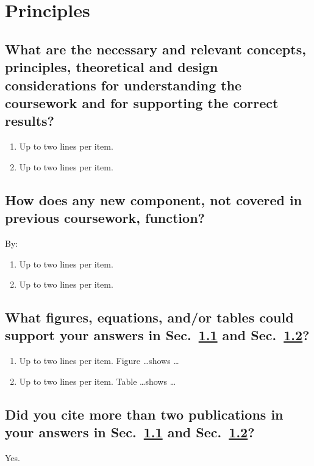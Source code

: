  








\section{Principles}
\label{sec:concps}

\subsection{What are the necessary and relevant concepts, principles, theoretical and design considerations for understanding the coursework and for supporting the correct results?}
\label{sec:nrcp}
\begin{enumerate}
\item Up to two lines per item.
\item Up to two lines per item.
\end{enumerate}

\subsection{How does any new component, not covered in previous coursework, function?}
\label{sec:nfxn}
By:
\begin{enumerate}
\item Up to two lines per item.
\item Up to two lines per item.
\end{enumerate}
	
\subsection{What figures, equations, and/or tables could support your answers in Sec.~\ref{sec:nrcp} and Sec.~\ref{sec:nfxn}?}
\begin{enumerate}
\item Up to two lines per item. Figure \ldots shows \ldots
\item Up to two lines per item. Table \ldots shows \ldots
\end{enumerate}
	
\subsection{Did you cite more than two publications in your answers in Sec.~\ref{sec:nrcp} and Sec.~\ref{sec:nfxn}?}
Yes.
	
